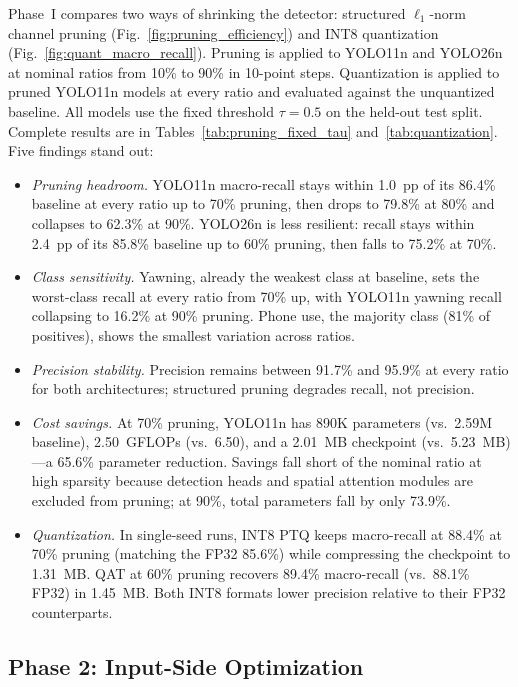 \documentclass[conference]{IEEEtran}
\begin{document}
Phase~I compares two ways of shrinking the detector: structured $\ell_1$-norm channel pruning (Fig.~\ref{fig:pruning_efficiency}) and INT8 quantization (Fig.~\ref{fig:quant_macro_recall}). Pruning is applied to YOLO11n and YOLO26n at nominal ratios from 10\% to 90\% in 10-point steps. Quantization is applied to pruned YOLO11n models at every ratio and evaluated against the unquantized baseline. All models use the fixed threshold $\tau = 0.5$ on the held-out test split. Complete results are in Tables~\ref{tab:pruning_fixed_tau} and~\ref{tab:quantization}. Five findings stand out:
\begin{itemize}
\item \emph{Pruning headroom.} YOLO11n macro-recall stays within 1.0~pp of its 86.4\% baseline at every ratio up to 70\% pruning, then drops to 79.8\% at 80\% and collapses to 62.3\% at 90\%. YOLO26n is less resilient: recall stays within 2.4~pp of its 85.8\% baseline up to 60\% pruning, then falls to 75.2\% at 70\%.
\item \emph{Class sensitivity.} Yawning, already the weakest class at baseline, sets the worst-class recall at every ratio from 70\% up, with YOLO11n yawning recall collapsing to 16.2\% at 90\% pruning. Phone use, the majority class (81\% of positives), shows the smallest variation across ratios.
\item \emph{Precision stability.} Precision remains between 91.7\% and 95.9\% at every ratio for both architectures; structured pruning degrades recall, not precision.
\item \emph{Cost savings.} At 70\% pruning, YOLO11n has 890K parameters (vs.\ 2.59M baseline), 2.50~GFLOPs (vs.\ 6.50), and a 2.01~MB checkpoint (vs.\ 5.23~MB)---a 65.6\% parameter reduction. Savings fall short of the nominal ratio at high sparsity because detection heads and spatial attention modules are excluded from pruning; at 90\%, total parameters fall by only 73.9\%.
\item \emph{Quantization.} In single-seed runs, INT8 PTQ keeps macro-recall at 88.4\% at 70\% pruning (matching the FP32 85.6\%) while compressing the checkpoint to 1.31~MB. QAT at 60\% pruning recovers 89.4\% macro-recall (vs.\ 88.1\% FP32) in 1.45~MB. Both INT8 formats lower precision relative to their FP32 counterparts. 
\end{itemize}

\subsection{Phase 2: Input-Side Optimization}
\newcommand{\seearrow}{\rotatebox[origin=c]{-20}{$\rightarrow$}}
\end{document}
